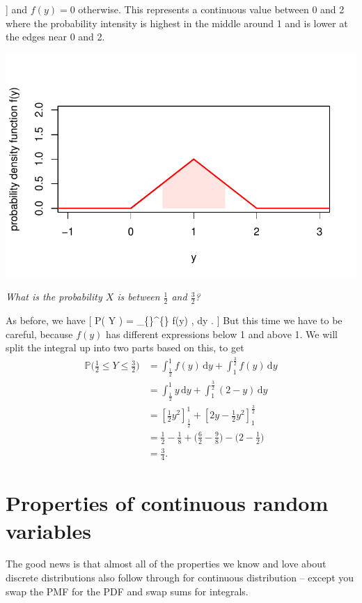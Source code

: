 \documentclass[
  letterpaper,
]{report}
\theoremstyle{definition}
\theoremstyle{definition}
\theoremstyle{remark}
\begin{document}
{]} and \(f(y) = 0\) otherwise. This represents a continuous value
between 0 and 2 where the probability intensity is highest in the middle
around 1 and is lower at the edges near 0 and 2.

\includegraphics{sections/L15-continuous_files/figure-pdf/second-pdf-1.pdf}

\emph{What is the probability \(X\) is between \(\frac12\) and
\(\frac32\)?}

As before, we have {[} \mathbb P\big(  \leq Y \leq {}
\big) = \int\_\{\}\^{}\{\} f(y) , \mathrm dy . {]} But
this time we have to be careful, because \(f(y)\) has different
expressions below 1 and above 1. We will split the integral up into two
parts based on this, to get \begin{align*}
\mathbb P\big( \tfrac12 \leq Y \leq \tfrac32 \big) 
  &= \int_{\frac12}^{1} f(y) \, \mathrm dy + \int_{1}^{\frac32} f(y) \, \mathrm dy \\
    &= \int_{\frac12}^{1} y \, \mathrm dy + \int_{1}^{\frac32} (2-y) \, \mathrm dy \\
    &= \left[ \tfrac12 y^2\right]_{\frac12}^1 + \left[ 2y-\tfrac12 y^2\right]_1^{\frac32} \\
    &= \tfrac12 - \tfrac18 + \big(\tfrac62 - \tfrac98\big) - \big(2 - \tfrac12\big) \\
    &= \tfrac34 .
\end{align*}

\hypertarget{prop-cont}{%
\section{Properties of continuous random variables}\label{prop-cont}}

The good news is that almost all of the properties we know and love
about discrete distributions also follow through for continuous
distribution -- except you swap the PMF for the PDF and swap sums for
integrals.
\end{document}

